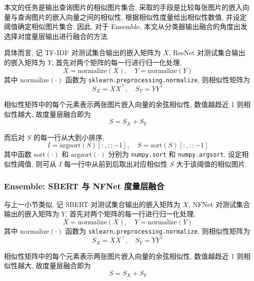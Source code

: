 \documentclass[12pt]{article}
\begin{document}
本文的任务是输出查询图片的相似图片集合, 采取的手段是比较每张图片的嵌入向量与查询图片的嵌入向量之间的相似性, 根据相似性度量给出相似性数值, 并设定阈值确定相似图片集合. 因此, 对于 Ensemble, 本文从分类器输出融合的角度出发选择对度量层输出进行融合的方法.

具体而言, 记 TF-IDF 对测试集合输出的嵌入矩阵为 $X$, ResNet 对测试集合输出的嵌入矩阵为 $Y$, 首先对两个矩阵的每一行进行归一化处理, 
\begin{equation}
  X = \text{normalize}(X),\quad Y = \text{normalize}(Y)
\end{equation}
其中 $\text{normalize}(\cdot)$ 函数为 \verb|sklearn.preprocessing.normalize|, 则相似性矩阵为
\begin{equation}
  S_X = XX^\top,\quad S_Y=YY^\top
\end{equation}

相似性矩阵中的每个元素表示两张图片嵌入向量的余弦相似性, 数值越趋近 1 则相似性越大, 故度量层融合即为
\begin{equation}
  S = S_X + S_Y
\end{equation}

而后对 $S$ 的每一行从大到小排序, 
\begin{equation}
  I=\text{argsort}(S)[:,::-1],\quad S = \text{sort}(S)[:,::-1]
\end{equation}
其中函数 $\text{sort}(\cdot)$ 和 $\text{argsort}(\cdot)$ 分别为 \verb|numpy.sort| 和 \verb|numpy.argsort|. 设定相似性阈值, 则可从 $I$ 每一行中从前到后取出对应相似性 $S$ 大于该阈值的相似图片.

\subsubsection{Ensemble: SBERT 与 NFNet 度量层融合}

与上一小节类似, 记 SBERT 对测试集合输出的嵌入矩阵为 $X$, NFNet 对测试集合输出的嵌入矩阵为 $Y$, 首先对两个矩阵的每一行进行归一化处理, 
\begin{equation}
  X = \text{normalize}(X),\quad Y = \text{normalize}(Y)
\end{equation}
其中 $\text{normalize}(\cdot)$ 函数为 \verb|sklearn.preprocessing.normalize|, 则相似性矩阵为
\begin{equation}
  S_X = XX^\top,\quad S_Y=YY^\top
\end{equation}

相似性矩阵中的每个元素表示两张图片嵌入向量的余弦相似性, 数值越趋近 1 则相似性越大, 故度量层融合即为
\begin{equation}
  S = S_X + S_Y
\end{equation}
\end{document}

